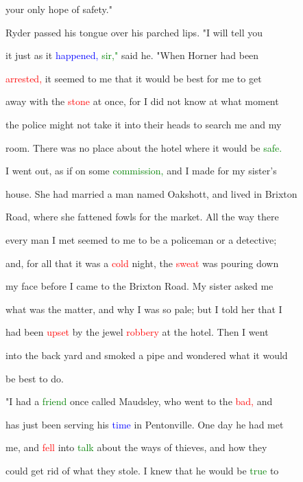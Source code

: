  your only \textcolor{BurntOrange}{hope} of safety."



 Ryder passed his tongue over his parched lips. "I will tell you

 it just as it \textcolor{blue}{happened,} \textcolor{green}{sir,"} said he. "When Horner had been

 \textcolor{red}{arrested,} it seemed to me that it would be best for me to get

 away with the \textcolor{red}{stone} at once, for I did not know at what moment

 the \textcolor{BurntOrange}{police} might not take it into their heads to search me and my

 room. There was no place about the hotel where it would be \textcolor{green}{safe.}

 I went out, as if on some \textcolor{green}{commission,} and I made for my sister's

 house. She had married a man named Oakshott, and lived in Brixton

 Road, where she fattened fowls for the market. All the way there

 every man I met seemed to me to be a \textcolor{BurntOrange}{policeman} or a detective;

 and, for all that it was a \textcolor{red}{cold} night, the \textcolor{red}{sweat} was pouring down

 my face before I came to the Brixton Road. My sister asked me

 what was the matter, and why I was so pale; but I told her that I

 had been \textcolor{red}{upset} by the jewel \textcolor{red}{robbery} at the hotel. Then I went

 into the back yard and smoked a pipe and wondered what it would

 be best to do.



 "I had a \textcolor{green}{friend} once called Maudsley, who went to the \textcolor{red}{bad,} and

 has just been \textcolor{BurntOrange}{serving} his \textcolor{blue}{time} in Pentonville. One day he had met

 me, and \textcolor{red}{fell} into \textcolor{green}{talk} about the ways of \textcolor{BurntOrange}{thieves,} and how they

 could get rid of what they stole. I knew that he would be \textcolor{green}{true} to

